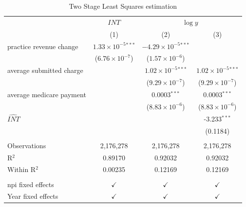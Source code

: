 \documentclass[
  12pt,
]{article}
\begin{document}
\begin{table}[ht]
\centering
\begin{tabular}{lccc}
   \toprule
    & $INT$ & \multicolumn{2}{c}{$\log y$}\\
                                      & (1)                           & (2)                            & (3)\\  
   \midrule 
   practice revenue change              & $1.33\times 10^{-5}$$^{***}$  & $-4.29\times 10^{-5}$$^{***}$  &   \\   
                                      & ($6.76\times 10^{-7}$)        & ($1.57\times 10^{-6}$)         &   \\   
   average submitted charge      &                               & $1.02\times 10^{-5}$$^{***}$   & $1.02\times 10^{-5}$$^{***}$\\    
                                      &                               & ($9.29\times 10^{-7}$)         & ($9.29\times 10^{-7}$)\\    
   average medicare payment    &                               & 0.0003$^{***}$                 & 0.0003$^{***}$\\   
                                      &                               & ($8.83\times 10^{-6}$)         & ($8.83\times 10^{-6}$)\\    
   $\hat{INT}$                             &                               &                                & -3.233$^{***}$\\   
                                      &                               &                                & (0.1184)\\   
    \\
   Observations                       & 2,176,278                     & 2,176,278                      & 2,176,278\\  
   R$^2$                              & 0.89170                       & 0.92032                        & 0.92032\\  
   Within R$^2$                       & 0.00235                       & 0.12169                        & 0.12169\\  
    \\
   npi fixed effects                  & $\checkmark$                  & $\checkmark$                   & $\checkmark$\\   
   Year fixed effects                 & $\checkmark$                  & $\checkmark$                   & $\checkmark$\\   
   \bottomrule
\end{tabular}
\caption{Two Stage Least Squares estimation}
\end{table}
\end{document}
